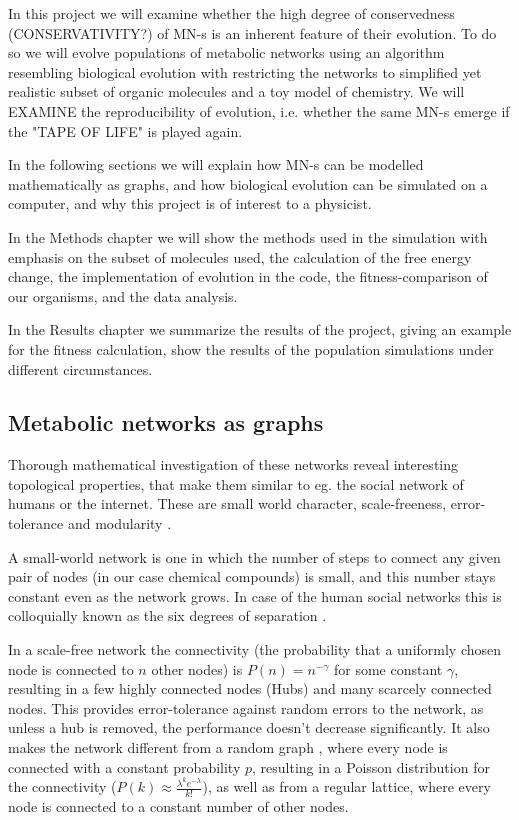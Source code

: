 \documentclass[10pt,a4paper]{article}
\begin{document}
	In this project we will examine whether the high degree of conservedness (CONSERVATIVITY?) of MN-s is an inherent feature of their evolution. To do so we will evolve populations of metabolic networks using an algorithm resembling biological evolution with restricting the networks to simplified yet realistic subset of organic molecules and a toy model of chemistry. We will EXAMINE the reproducibility of evolution, i.e. whether the same MN-s emerge if the "TAPE OF LIFE" is played again. 

	In the following sections we will explain how MN-s can be modelled mathematically as graphs, and how biological evolution can be simulated on a computer, and why this project is of interest to a physicist.

	In the Methods chapter we  will show the methods used in the simulation with emphasis on the subset of molecules used, the calculation of the free energy change, the implementation of evolution in the code, the fitness-comparison of our organisms, and the data analysis. 

	In the Results chapter we summarize the results of the project, giving an example for the fitness calculation, show the results of the population simulations under different circumstances.



	
	\subsection{Metabolic networks as graphs}
	Thorough mathematical investigation of these networks reveal interesting topological properties, that make them similar to eg. the social network of humans or the internet. These are small world character, scale-freeness, error-tolerance \cite{largescale} and modularity .
	
	A small-world network \cite{smallworld} is one in which the number of steps to connect any given pair of nodes (in our case chemical compounds) is small, and this number stays constant even as the network grows. In case of the human social networks this is colloquially known as the six degrees of separation \cite{sixdegrees}.
	 
	In a scale-free network the connectivity (the probability that a uniformly chosen node is connected to $n$ other nodes) is $P(n)=n^{-\gamma}$ for some constant $\gamma$, resulting in a few highly connected nodes (Hubs) and many scarcely connected nodes. This provides error-tolerance against random errors to the network, as unless a hub is removed, the performance doesn't decrease significantly. It also makes the network different from a random graph \cite{randomgraphs}, where every node is connected with a constant probability $p$, resulting in a Poisson distribution for the connectivity ($P(k) \approx \frac{\lambda^k e^{-\lambda}}{k!} $), as well as from a regular lattice, where every node is connected to a constant number of other nodes.
	  
\end{document}
